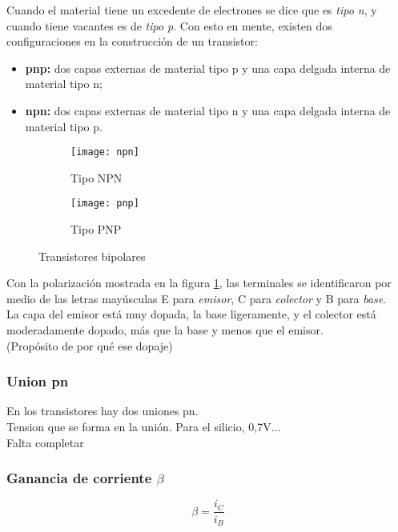 Cuando el material tiene un excedente de electrones se dice que es \textsl{tipo n}, y cuando tiene vacantes es de \textsl{tipo p}. Con esto en mente, existen dos configuraciones en la construcción de un transistor:

\begin{itemize}
	\item \textbf{pnp:} dos capas externas de material tipo p y una capa delgada interna de material tipo n;
	\item \textbf{npn:} dos capas externas de material tipo n y una capa delgada interna de material tipo p.
\end{itemize}

\begin{figure}[H]
	\centering
	\begin{subfigure}[b]{.4\linewidth}
		\texttt{[image: npn]}
		\caption{Tipo NPN}
	\end{subfigure}
	\begin{subfigure}[b]{.4\linewidth}
		\texttt{[image: pnp]}
		\caption{Tipo PNP}
	\end{subfigure}
	\caption{Transistores bipolares}
	\label{fig:transistores}
\end{figure}

Con la polarización mostrada en la figura \ref{fig:transistores}, las terminales se identificaron por medio de las
letras mayúsculas E para \textsl{emisor}, C para \textsl{colector} y B para \textsl{base}.\\

La capa del emisor está muy dopada, la base ligeramente, y el colector está moderadamente dopado, más que la base y menos que el emisor. \\
(Propósito de por qué ese dopaje)

\subsubsection{Union pn}

En los transistores hay dos uniones pn.\\

Tension que se forma en la unión.
Para el silicio, 0,7V...\\

Falta completar

\subsubsection{Ganancia de corriente $\beta$}

\begin{equation}
	\beta = \dfrac{i_C}{i_B}
\end{equation}